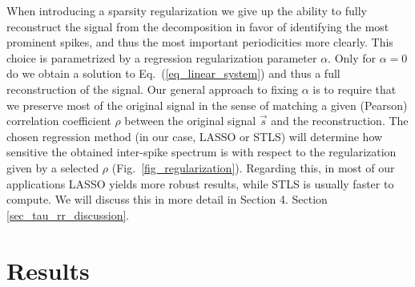 \documentclass[entropy,article,submit,pdftex,moreauthors]{Definitions/mdpi}
\begin{document}
When introducing a sparsity regularization we give up the ability to fully reconstruct the signal from the decomposition in favor of identifying the most prominent spikes, and thus the most important periodicities more clearly. This choice is parametrized by a regression regularization parameter $\alpha$. Only for $\alpha = 0$ do we obtain a solution to Eq.~(\ref{eq_linear_system}) and thus a full reconstruction of the signal. Our general approach to fixing $\alpha$ is to require that we preserve most of the original signal in the sense of matching a given (Pearson) correlation coefficient $\rho$ between the original signal $\vec{s}$ and the reconstruction. The chosen regression method (in our case, LASSO or STLS) will determine how sensitive the obtained inter-spike spectrum is with respect to the regularization given by a 
selected $\rho$ (Fig.~\ref{fig_regularization}). Regarding this, in most of our applications LASSO yields more robust results, while STLS is usually faster to compute. 
We will discuss this in more detail in Section 4. Section \ref{sec_tau_rr_discussion}.

%

\section{Results}\label{sec_tau_rr_application}
\end{document}
